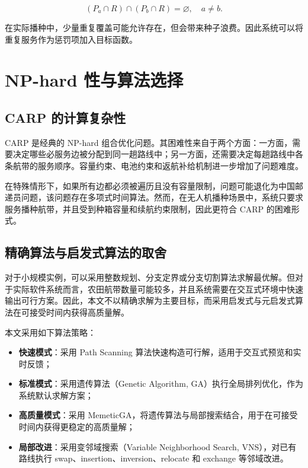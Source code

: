\documentclass[UTF8,a4paper,12pt]{ctexart}
\begin{document}
\[
(P_a \cap R) \cap (P_b \cap R) = \varnothing,\quad a\neq b.
\]

在实际播种中，少量重复覆盖可能允许存在，但会带来种子浪费。因此系统可以将重复服务作为惩罚项加入目标函数。

\section{NP-hard 性与算法选择}

\subsection{CARP 的计算复杂性}

CARP 是经典的 NP-hard 组合优化问题。其困难性来自于两个方面：一方面，需要决定哪些必服务边被分配到同一趟路线中；另一方面，还需要决定每趟路线中各条航带的服务顺序。容量约束、电池约束和返航补给机制进一步增加了问题难度。

在特殊情形下，如果所有边都必须被遍历且没有容量限制，问题可能退化为中国邮递员问题，该问题存在多项式时间算法。然而，在无人机播种场景中，系统只要求服务播种航带，并且受到种箱容量和续航约束限制，因此更符合 CARP 的困难形式。

\subsection{精确算法与启发式算法的取舍}

对于小规模实例，可以采用整数规划、分支定界或分支切割算法求解最优解。但对于实际软件系统而言，农田航带数量可能较多，并且系统需要在交互式环境中快速输出可行方案。因此，本文不以精确求解为主要目标，而采用启发式与元启发式算法在可接受时间内获得高质量解。

本文采用如下算法策略：

\begin{itemize}
    \item \textbf{快速模式}：采用 Path Scanning 算法快速构造可行解，适用于交互式预览和实时反馈；
    \item \textbf{标准模式}：采用遗传算法（Genetic Algorithm, GA）执行全局排列优化，作为系统默认求解方案；
    \item \textbf{高质量模式}：采用 MemeticGA，将遗传算法与局部搜索结合，用于在可接受时间内获得更稳定的高质量解；
    \item \textbf{局部改进}：采用变邻域搜索（Variable Neighborhood Search, VNS），对已有路线执行 swap、insertion、inversion、relocate 和 exchange 等邻域改进。
\end{itemize}
\end{document}
